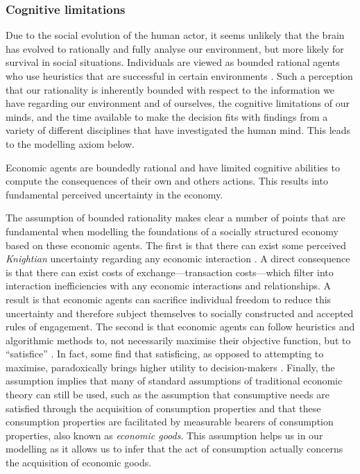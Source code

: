 \subsubsection{Cognitive limitations}

Due to the social evolution of the human actor, it seems unlikely that the brain has evolved to rationally and fully analyse our environment, but more likely for survival in social situations. Individuals are viewed as bounded rational agents who use heuristics that are successful in certain environments \citep{TverskyKahneman1974}. Such a perception that our rationality is inherently bounded with respect to the information we have regarding our environment and of ourselves, the cognitive limitations of our minds, and the time available to make the decision fits with findings from a variety of different disciplines that have investigated the human mind. This leads to the modelling axiom below.

\begin{axiom} \label{ax:boundedrationality}
Economic agents are boundedly rational and have limited cognitive abilities to compute the consequences of their own and others actions. This results into fundamental perceived uncertainty in the economy.
\end{axiom}

The assumption of bounded rationality makes clear a number of points that are fundamental when modelling the foundations of a socially structured economy based on these economic agents. The first is that there can exist some perceived \emph{Knightian} uncertainty regarding any economic interaction \citep{Knight1921}. A direct consequence is that there can exist costs of exchange---transaction costs---which filter into interaction inefficiencies with any economic interactions and relationships. A result is that economic agents can sacrifice individual freedom to reduce this uncertainty and therefore subject themselves to socially constructed and accepted rules of engagement. The second is that economic agents can follow heuristics and algorithmic methods to, not necessarily maximise their objective function, but to ``satisfice'' \citep{Simon1947, Simon1956}. In fact, some find that satisficing, as opposed to attempting to maximise, paradoxically brings higher utility to decision-makers \citep{Schwartz2002}. Finally, the assumption implies that many of standard assumptions of traditional economic theory can still be used, such as the assumption that consumptive needs are satisfied through the acquisition of consumption properties and that these consumption properties are facilitated by measurable bearers of consumption properties, also known as \emph{economic goods}. This assumption helps us in our modelling as it allows us to infer that the act of consumption actually concerns the acquisition of economic goods.

